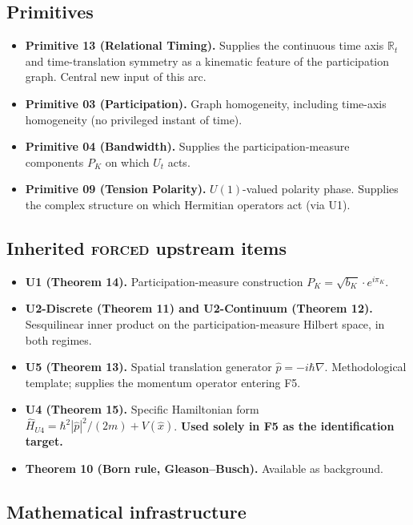 \documentclass[11pt,a4paper]{article}
\begin{document}
\subsection{Primitives}

\begin{itemize}
  \item \textbf{Primitive 13 (Relational Timing).} Supplies the continuous time axis $\mathbb{R}_t$ and time-translation symmetry as a kinematic feature of the participation graph. Central new input of this arc.
  \item \textbf{Primitive 03 (Participation).} Graph homogeneity, including time-axis homogeneity (no privileged instant of time).
  \item \textbf{Primitive 04 (Bandwidth).} Supplies the participation-measure components $P_K$ on which $U_t$ acts.
  \item \textbf{Primitive 09 (Tension Polarity).} $U(1)$-valued polarity phase. Supplies the complex structure on which Hermitian operators act (via U1).
\end{itemize}

\subsection{Inherited \textsc{forced} upstream items}

\begin{itemize}
  \item \textbf{U1 (Theorem 14).} Participation-measure construction $P_K = \sqrt{b_K} \cdot e^{i\pi_K}$.
  \item \textbf{U2-Discrete (Theorem 11) and U2-Continuum (Theorem 12).} Sesquilinear inner product on the participation-measure Hilbert space, in both regimes.
  \item \textbf{U5 (Theorem 13).} Spatial translation generator $\hat{p} = -i\hbar\nabla$. Methodological template; supplies the momentum operator entering F5.
  \item \textbf{U4 (Theorem 15).} Specific Hamiltonian form $\hat{H}_{U4} = \hbar^2|\hat{p}|^2/(2m) + V(\hat{x})$. \textbf{Used solely in F5 as the identification target.}
  \item \textbf{Theorem 10 (Born rule, Gleason--Busch).} Available as background.
\end{itemize}

\subsection{Mathematical infrastructure}
\end{document}
